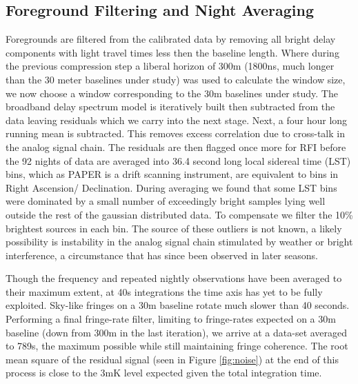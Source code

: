 \documentclass[preprint]{aastex}
\begin{document}
\subsection{Foreground Filtering and Night Averaging}
Foregrounds are filtered from the calibrated data by removing all bright delay components with light travel times less then the baseline length. Where during the previous compression step a liberal horizon of 300m (1800ns, much longer than the 30 meter baselines under study)  was used to calculate the window size, we now choose a window corresponding to the 30m baselines under study.  The broadband delay spectrum model is iteratively built then subtracted from the data leaving residuals which we carry into the next stage. Next, a four hour long running mean is subtracted. This removes excess correlation due to cross-talk in the analog signal chain. The residuals are then flagged once more for RFI before the 92 nights of data are averaged into 36.4 second long local sidereal time (LST) bins, which as PAPER is a drift scanning instrument, are equivalent to bins in Right Ascension/ Declination.  During averaging we found that some LST bins were dominated by a small number of exceedingly bright samples lying well outside the rest of the gaussian distributed data. To compensate we filter the 10\% brightest sources in each bin.  The source of these outliers is not known,  a likely possibility is instability in the analog signal chain stimulated by weather or bright interference, a circumstance that has since been observed in later seasons. 


Though the frequency and repeated nightly observations have been averaged to their maximum extent, at 40s integrations the time axis has yet to be fully exploited.  Sky-like fringes on a 30m baseline rotate much slower than 40 seconds.  Performing a final fringe-rate filter, limiting to fringe-rates expected on a 30m baseline (down from 300m in the last iteration), we arrive at a data-set averaged to 789s, the maximum possible while still maintaining fringe coherence.    The root mean square of the residual signal (seen in Figure \ref{fig:noise}) at the end of this process is close to the 3mK level expected given the total integration time.  

\end{document}

